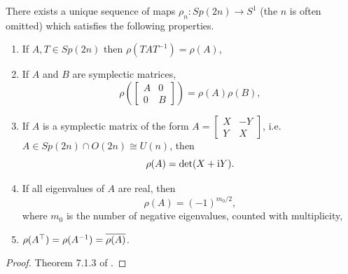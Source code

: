 \begin{theorem}\label{rhodef}
There exists a unique sequence of maps $\rho_n \colon Sp(2n) \to S^1$ (the $n$ is often omitted) which satisfies the following properties.
\begin{enumerate}[label=\roman*)]
\item If $A, T \in Sp(2n)$ then $\rho(T A T^{-1}) = \rho(A)$,
\item If $A$ and $B$ are symplectic matrices,
\begin{equation}
\rho\left(\begin{bmatrix} A & 0 \\ 0 & B \end{bmatrix}\right) = \rho(A) \rho(B),
\end{equation}
\item\label{rhodef:xy} If $A$ is a symplectic matrix of the form $A = \begin{bmatrix} X & -Y \\ Y & X \end{bmatrix}$, i.e. $A \in Sp(2n) \cap O(2n) \cong U(n)$, then
\begin{equation}
\rho(A) = \det(X + \mathrm{i} Y).
\end{equation}
\item\label{rhodef:realev} If all eigenvalues of $A$ are real, then
\begin{equation}
\rho(A) = (-1)^{m_0/2},
\end{equation}
where $m_0$ is the number of negative eigenvalues, counted with multiplicity,
\item $\rho(A^\top) = \rho(A^{-1}) = \overline{\rho(A)}$.
\end{enumerate}
\end{theorem}

\begin{proof}
Theorem 7.1.3 of \cite{audin}.
\end{proof}

